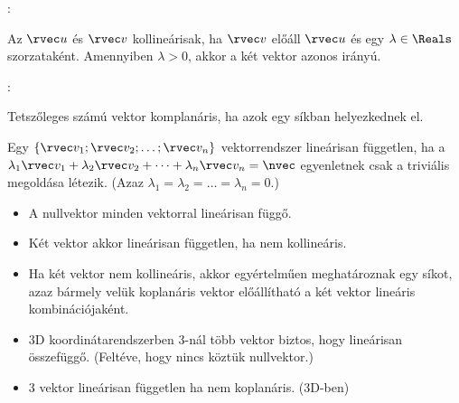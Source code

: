 \documentclass[a4paper, 12pt]{scrartcl}
\begin{document}
\begin{blueBox}
  :

  Az $\rvec u$ és $\rvec v$ kollineárisak, ha $\rvec v$ előáll $\rvec u$ és egy
  $\lambda \in \Reals$ szorzataként. Amennyiben $\lambda > 0$, akkor a két
  vektor azonos irányú.
\end{blueBox}

\begin{blueBox}
  :

  Tetszőleges számú vektor komplanáris, ha azok egy síkban helyezkednek el.
\end{blueBox}

\begin{definition}
  Egy $\{ \rvec v_1; \rvec v_2; \dots; \rvec v_n \}$ vektorrendszer lineárisan
  független, ha a $ \lambda_1 \rvec v_1 + \lambda_2 \rvec v_2 + \dots + \lambda_n
    \rvec v_n = \nvec $ egyenletnek csak a triviális megoldása létezik. (Azaz
  $\lambda_1 = \lambda_2 = \dots = \lambda_n = 0$.)
\end{definition}

\begin{note}
  \begin{itemize}
    \item A nullvektor minden vektorral lineárisan függő.
    \item Két vektor akkor lineárisan független, ha nem kollineáris.
    \item Ha két vektor nem kollineáris, akkor egyértelműen meghatároznak egy
          síkot, azaz bármely velük koplanáris vektor előállítható a két vektor
          lineáris kombinációjaként.
    \item 3D koordinátarendszerben 3-nál több vektor biztos, hogy lineárisan
          összefüggő. (Feltéve, hogy nincs köztük nullvektor.)
    \item 3 vektor lineárisan független ha nem koplanáris. (3D-ben)
  \end{itemize}
\end{note}
\end{document}
